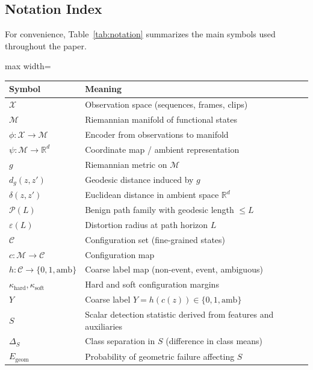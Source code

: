 \documentclass[11pt]{article}
\theoremstyle{remark}
\theoremstyle{plain}
\begin{document}
\subsection{Notation Index}
\label{subsec:notation-index}

For convenience, Table~\ref{tab:notation} summarizes the main symbols used throughout
the paper.

\begin{table}[t]
    \centering
    \begin{adjustbox}{max width=\linewidth}
    \begin{tabular}{ll}
        \toprule
        Symbol & Meaning \\
        \midrule
        $\mathcal{X}$ & Observation space (sequences, frames, clips) \\
        $\mathcal{M}$ & Riemannian manifold of functional states \\
        $\phi:\mathcal{X}\to\mathcal{M}$ & Encoder from observations to manifold \\
        $\psi:\mathcal{M}\to\mathbb{R}^d$ & Coordinate map / ambient representation \\
        $g$ & Riemannian metric on $\mathcal{M}$ \\
        $d_g(z,z')$ & Geodesic distance induced by $g$ \\
        $\delta(z,z')$ & Euclidean distance in ambient space $\mathbb{R}^d$ \\
        $\mathcal{P}(L)$ & Benign path family with geodesic length $\le L$ \\
        $\varepsilon(L)$ & Distortion radius at path horizon $L$ \\
        $\mathcal{C}$ & Configuration set (fine-grained states) \\
        $c:\mathcal{M}\to\mathcal{C}$ & Configuration map \\
        $h:\mathcal{C}\to\{0,1,\mathrm{amb}\}$ & Coarse label map (non-event, event, ambiguous) \\
        $\kappa_{\mathrm{hard}},\kappa_{\mathrm{soft}}$ & Hard and soft configuration margins \\
        $Y$ & Coarse label $Y=h(c(z))\in\{0,1,\mathrm{amb}\}$ \\
        $S$ & Scalar detection statistic derived from features and auxiliaries \\
        $\Delta_S$ & Class separation in $S$ (difference in class means) \\
        $E_{\text{geom}}$ & Probability of geometric failure affecting $S$ \\

\end{tabular}
\end{adjustbox}
\end{table}
\end{document}
